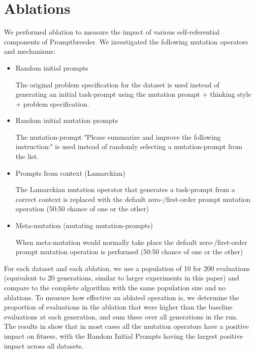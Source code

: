 \documentclass{article} %
\begin{document}
\section{Ablations}
\label{appendix:ablation}
We performed ablation to measure the impact of various self-referential components of Promptbreeder. We investigated the following mutation operators and mechanisms:
\begin{itemize}
    \item Random initial prompts
    
    The original problem specification for the dataset is used instead of generating an initial task-prompt using the mutation prompt + thinking style + problem specification. 
    \item Random initial mutation prompts
    
    The mutation-prompt "Please summarize and improve the following instruction:" is used instead of randomly selecting a mutation-prompt from the list.
    \item Prompts from context (Lamarckian)
    
    The Lamarckian mutation operator that generates a task-prompt from a correct context is replaced with the default zero-/first-order prompt mutation operation (50:50 chance of one or the other)
    \item Meta-mutation (mutating mutation-prompts)
    
    When meta-mutation would normally take place the default zero-/first-order prompt mutation operation is performed (50:50 chance of one or the other)
\end{itemize}

For each dataset and each ablation, we use a population of 10 for 200 evaluations (equivalent to 20 generations, similar to larger experiments in this paper) and compare to the complete algorithm with the same population size and no ablations. To measure how effective an ablated operation is, we determine the proportion of evaluations in the ablation that were higher than the baseline evaluations at each generation, and sum these over all generations in the run. The results in  show that in most cases all the mutation operators have a positive impact on fitness, with the Random Initial Prompts having the largest positive impact across all datasets. 
\end{document}
